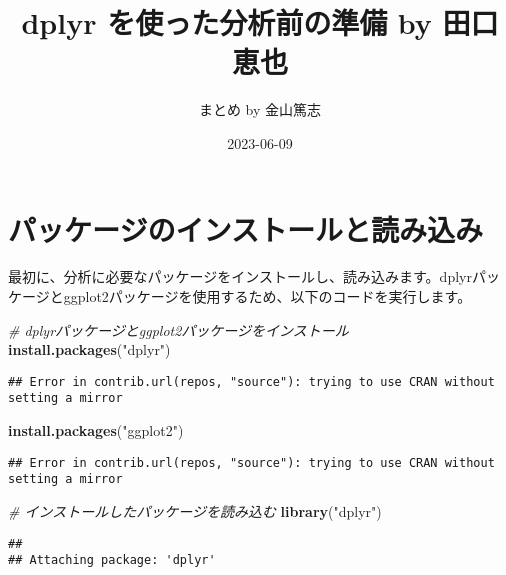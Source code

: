 \documentclass[
]{article}
\title{dplyr を使った分析前の準備 by 田口恵也}
\author{まとめ by 金山篤志}
\date{2023-06-09}
\newenvironment{Shaded}{\begin{snugshade}}{\end{snugshade}}
\newcommand{\CommentTok}[1]{\textcolor[rgb]{0.56,0.35,0.01}{\textit{#1}}}
\newcommand{\FunctionTok}[1]{\textcolor[rgb]{0.13,0.29,0.53}{\textbf{#1}}}
\newcommand{\NormalTok}[1]{#1}
\newcommand{\StringTok}[1]{\textcolor[rgb]{0.31,0.60,0.02}{#1}}
\begin{document}
\maketitle

{
\setcounter{tocdepth}{2}
\tableofcontents
}
\hypertarget{ux30d1ux30c3ux30b1ux30fcux30b8ux306eux30a4ux30f3ux30b9ux30c8ux30fcux30ebux3068ux8aadux307fux8fbcux307f}{%
\section{パッケージのインストールと読み込み}\label{ux30d1ux30c3ux30b1ux30fcux30b8ux306eux30a4ux30f3ux30b9ux30c8ux30fcux30ebux3068ux8aadux307fux8fbcux307f}}

最初に、分析に必要なパッケージをインストールし、読み込みます。dplyrパッケージとggplot2パッケージを使用するため、以下のコードを実行します。

\begin{Shaded}
\begin{Highlighting}[]
\CommentTok{\# dplyrパッケージとggplot2パッケージをインストール}
\FunctionTok{install.packages}\NormalTok{(}\StringTok{"dplyr"}\NormalTok{)}
\end{Highlighting}
\end{Shaded}

\begin{verbatim}
## Error in contrib.url(repos, "source"): trying to use CRAN without setting a mirror
\end{verbatim}

\begin{Shaded}
\begin{Highlighting}[]
\FunctionTok{install.packages}\NormalTok{(}\StringTok{"ggplot2"}\NormalTok{)}
\end{Highlighting}
\end{Shaded}

\begin{verbatim}
## Error in contrib.url(repos, "source"): trying to use CRAN without setting a mirror
\end{verbatim}

\begin{Shaded}
\begin{Highlighting}[]
\CommentTok{\# インストールしたパッケージを読み込む}
\FunctionTok{library}\NormalTok{(}\StringTok{"dplyr"}\NormalTok{)}
\end{Highlighting}
\end{Shaded}

\begin{verbatim}
## 
## Attaching package: 'dplyr'
\end{verbatim}
\end{document}
